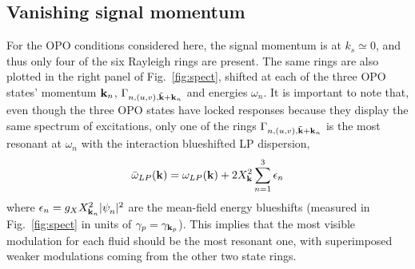 
\subsection{Vanishing signal momentum}
\label{subsec:vanishing-signal}
%
For the OPO conditions considered here, the signal momentum is at
$k_s \simeq 0$, and thus only four of the six Rayleigh rings are
present. The same rings are also plotted in the right panel of
Fig.~\ref{fig:spect}, shifted at each of the three OPO states'
momentum $\mathbf{k}_n$, $\Gamma_{n,(u,v), \tilde{\mathbf{k}}+\mathbf{k}_n}$ and
energies $\omega_n$.
%
It is important to note that, even though the three OPO states have
locked responses because they display the same spectrum of
excitations, only one of the rings $\Gamma_{n,(u,v),
  \tilde{\mathbf{k}}+\mathbf{k}_n}$ is the most resonant at $\omega_n$
with the interaction blueshifted LP dispersion,
%
\begin{equation}
  \bar{\omega}_{LP}({\mathbf{k}}) = \omega_{LP}({\mathbf{k}}) + 2
  X_{\mathbf{k}}^2 \sum_{n=1}^3  \epsilon_n
\label{eq:blues}
\end{equation}
%
where $\epsilon_n = g_X X_{\mathbf{k}_n}^2 |\psi_n^{}|^2$ are the
mean-field energy blueshifts (measured in Fig.~\ref{fig:spect} in
units of $\gamma_p = \gamma_{\mathbf{k}_p}$).  This implies that the
most visible modulation for each fluid should be the most resonant
one, with superimposed weaker modulations coming from the other two
state rings.

